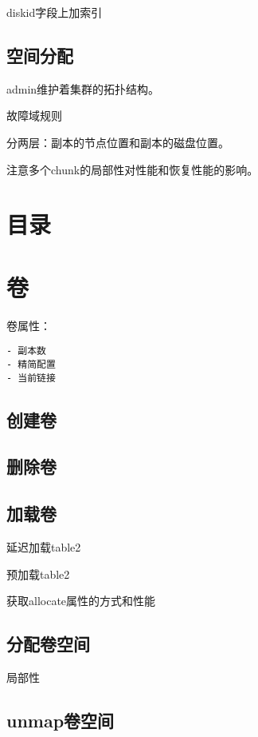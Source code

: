 diskid字段上加索引

\subsection{空间分配}

admin维护着集群的拓扑结构。

故障域规则

分两层：副本的节点位置和副本的磁盘位置。

注意多个chunk的局部性对性能和恢复性能的影响。

\section{目录}

\section{卷}

卷属性：
\begin{lstlisting}
- 副本数
- 精简配置
- 当前链接
\end{lstlisting}

\subsection{创建卷}

\subsection{删除卷}

\subsection{加载卷}

\begin{compactenum}
\item 延迟加载table2
\item 预加载table2
\item 获取allocate属性的方式和性能
\end{compactenum}

\subsection{分配卷空间}

局部性

\subsection{unmap卷空间}

